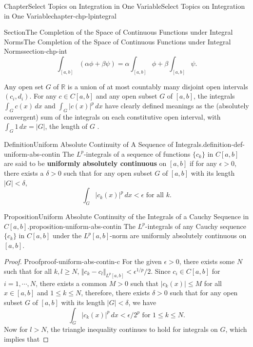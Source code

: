 \documentclass[oneside,10pt,]{book}
\newcommand{\terminology}[1]{\textbf{#1}}
\numberwithin{equation}{section}
\newcommand{\bbR}{\mathbb{R}}
\begin{document}
\begin{chapterptx}{Chapter}{Select Topics on Integration in One Variable}{}{Select Topics on Integration in One Variable}{}{}{chapter-chp-lpintegral}
\begin{sectionptx}{Section}{The Completion of the Space of Continuous Functions under Integral Norms}{}{The Completion of the Space of Continuous Functions under Integral Norms}{}{}{section-chp-int}
\begin{equation*}
\int_{[a, b]} (\alpha \phi + \beta \psi ) = \alpha \int_{[a, b]} \phi + \beta \int_{[a, b]} \psi.
\end{equation*}
%
\par
Any open set \(G\) of \(\bbR\) is a union of at most countably many disjoint open intervals \((c_{i}, d_{i})\). For any \(c\in C[a, b]\) and any open subset \(G\) of \([a, b]\), the integrals  \(\int_{G} c(x)\, dx\) and \(\int_{G} |c(x)|^{p}\, dx\) have  clearly defined meanings as the (absolutely convergent) sum of the integrals on each constitutive open interval, with \(\int_{G} 1\, dx=|G|\), the length of \(G\) .%
\begin{definition}{Definition}{Uniform Absolute Continuity of A Sequence of Integrals.}{definition-def-uniform-abs-contin}%
The \(L^{p}\)-integrals of a sequence of functions \(\{ c_{k}\}\)  in \(C[a, b]\) are said to be \terminology{uniformly absolutely continuous} on \([a, b]\) if for any \(\epsilon > 0\), there exists a \(\delta > 0\) such that for any open subset \(G\) of \([a, b]\) with its length \(|G| < \delta\),%
\begin{equation*}
\int_{G} |c_{k}(x)|^{p}\, dx < \epsilon \text{ for all } k.
\end{equation*}
%
\end{definition}
\begin{proposition}{Proposition}{Uniform Absolute Continuity of the Integrals of a Cauchy Sequence in \(C[a, b]\).}{}{proposition-uniform-abs-contin}%
The \(L^{p}\)-integrals of any  Cauchy sequence  \(\{ c_{k}\}\) in \(C[a, b]\) under the \(L^{p}[a,  b]\)-norm are uniformly absolutely continuous on \([a, b]\).\end{proposition}
\begin{proof}{Proof}{}{proof-uniform-abs-contin-c}
For the given \(\epsilon > 0\), there exists some \(N\) such that for all \(k, l \ge N\), \(\Vert c_{k} -c_{l}\Vert_{L^{p}[a,b]} < \epsilon^{1/p}/2\). Since \(c_{i}\in C[a, b]\) for \(i=1,\cdots, N\), there exists a common \(M > 0\) such that \(|c_{k}(x)|\le M\) for all \(x\in [a, b]\) and \(1\le k \le N\), therefore, there exists \(\delta > 0\) such that for any open subset \(G\) of \([a, b]\) with its length \(|G| < \delta\), we have%
\begin{equation*}
\int_{G} |c_{k}(x)|^{p}\, dx < \epsilon/2^{p} \text{ for } 1\le k \le N.
\end{equation*}
Now for \(l > N\), the triangle inequality continues to hold for integrals on \(G\), which implies that%

\end{proof}
\end{sectionptx}
\end{chapterptx}
\end{document}

